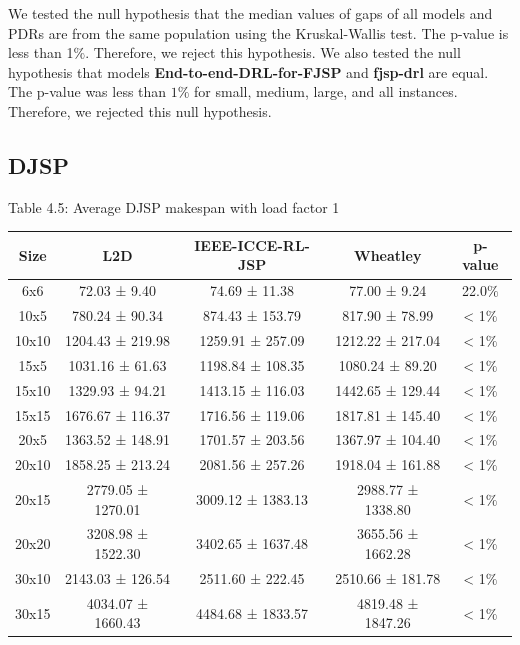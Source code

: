 We tested the null hypothesis that the median values of gaps of all models and PDRs are from the same population using the Kruskal-Wallis test. The p-value is less than 1$\%$. Therefore, we reject this hypothesis. We also tested the null hypothesis that models \textbf{End-to-end-DRL-for-FJSP} and \textbf{fjsp-drl} are equal. The p-value was less than $1\%$ for small, medium, large, and all instances. Therefore, we rejected this null hypothesis.

\subsection{DJSP}

\begin{table}[H]
    Table 4.5: Average DJSP makespan with load factor 1\\
    \vspace{1mm}
    \footnotesize 
    \begin{tabular}{ccccc}
        \toprule
        Size & L2D & IEEE-ICCE-RL-JSP & Wheatley & p-value \\
        \midrule
        6x6 & 72.03 ± 9.40 & 74.69 ± 11.38 & 77.00 ± 9.24 & 22.0$\%$ \\
        10x5 & 780.24 ± 90.34 & 874.43 ± 153.79 & 817.90 ± 78.99 & < 1$\%$ \\
        10x10 & 1204.43 ± 219.98 & 1259.91 ± 257.09 & 1212.22 ± 217.04 & < 1$\%$ \\
        15x5 & 1031.16 ± 61.63 & 1198.84 ± 108.35 & 1080.24 ± 89.20 & < 1$\%$ \\
        15x10 & 1329.93 ± 94.21 & 1413.15 ± 116.03 & 1442.65 ± 129.44 & < 1$\%$ \\
        15x15 & 1676.67 ± 116.37 & 1716.56 ± 119.06 & 1817.81 ± 145.40 & < 1$\%$ \\
        20x5 & 1363.52 ± 148.91 & 1701.57 ± 203.56 & 1367.97 ± 104.40 & < 1$\%$ \\
        20x10 & 1858.25 ± 213.24 & 2081.56 ± 257.26 & 1918.04 ± 161.88 & < 1$\%$ \\
        20x15 & 2779.05 ± 1270.01 & 3009.12 ± 1383.13 & 2988.77 ± 1338.80 & < 1$\%$ \\
        20x20 & 3208.98 ± 1522.30 & 3402.65 ± 1637.48 & 3655.56 ± 1662.28 & < 1$\%$ \\
        30x10 & 2143.03 ± 126.54 & 2511.60 ± 222.45 & 2510.66 ± 181.78 & < 1$\%$ \\
        30x15 & 4034.07 ± 1660.43 & 4484.68 ± 1833.57 & 4819.48 ± 1847.26 & < 1$\%$ \\

\end{tabular}
\end{table}
